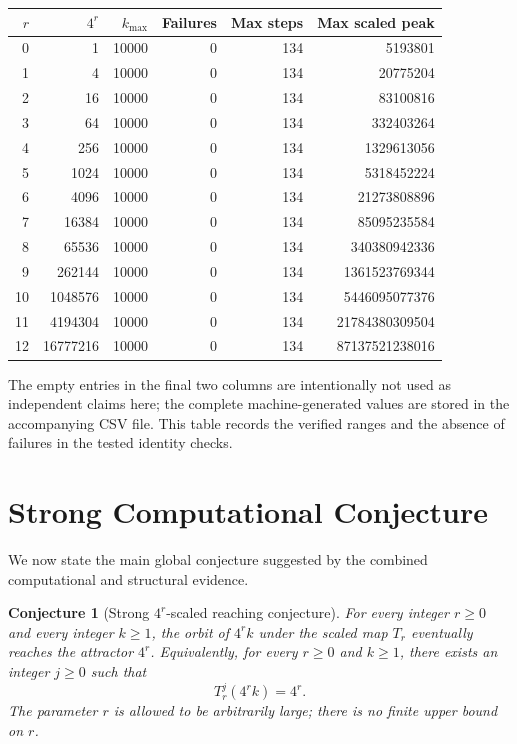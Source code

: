 \documentclass[11pt]{article}
\newtheorem{conjecture}[theorem]{Conjecture}
\begin{document}
\begin{center}
\begin{tabular}{rrrrrr}
\toprule
$r$ & $4^r$ & $k_{\max}$ & Failures & Max steps & Max scaled peak\\
\midrule
0 & 1 & 10000 & 0 & 134 & 5193801 \\
1 & 4 & 10000 & 0 & 134 & 20775204 \\
2 & 16 & 10000 & 0 & 134 & 83100816 \\
3 & 64 & 10000 & 0 & 134 & 332403264 \\
4 & 256 & 10000 & 0 & 134 & 1329613056 \\
5 & 1024 & 10000 & 0 & 134 & 5318452224 \\
6 & 4096 & 10000 & 0 & 134 & 21273808896 \\
7 & 16384 & 10000 & 0 & 134 & 85095235584 \\
8 & 65536 & 10000 & 0 & 134 & 340380942336 \\
9 & 262144 & 10000 & 0 & 134 & 1361523769344 \\
10 & 1048576 & 10000 & 0 & 134 & 5446095077376 \\
11 & 4194304 & 10000 & 0 & 134 & 21784380309504 \\
12 & 16777216 & 10000 & 0 & 134 & 87137521238016 \\
\bottomrule
\end{tabular}
\end{center}

The empty entries in the final two columns are intentionally not used as independent
claims here; the complete machine-generated values are stored in the accompanying CSV
file. This table records the verified ranges and the absence of failures in the tested
identity checks.

\section{Strong Computational Conjecture}
We now state the main global conjecture suggested by the combined computational and structural evidence.

\begin{conjecture}[Strong $4^r$-scaled reaching conjecture]
For every integer $r\ge0$ and every integer $k\ge1$, the orbit of $4^rk$ under the scaled map $T_r$ eventually reaches the attractor $4^r$. Equivalently, for every $r\ge0$ and $k\ge1$, there exists an integer $j\ge0$ such that
\begin{equation}
T_r^j(4^rk)=4^r.
\label{eq:strongconj}
\end{equation}
The parameter $r$ is allowed to be arbitrarily large; there is no finite upper bound on $r$.
\end{conjecture}
\end{document}
